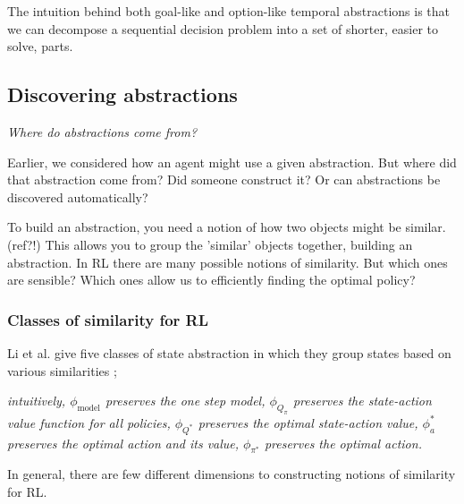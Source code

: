 The intuition behind both goal-like and option-like temporal abstractions is that
we can decompose a sequential decision problem into a set of shorter, easier to solve, parts.

\subsection{Discovering abstractions}

\begin{displayquote}
  \textit{Where do abstractions come from?}
\end{displayquote}

Earlier, we considered how an agent might use a given abstraction.
But where did that abstraction come from? Did someone construct it?
Or can abstractions be discovered automatically?

To build an abstraction, you need a notion of how two objects might be similar. {\color{red}(ref?!)}
This allows you to group the 'similar' objects together, building an abstraction.
In RL there are many possible notions of similarity. But which ones are sensible?
Which ones allow us to efficiently finding the optimal policy?

\vspace{5mm}

\subsubsection{Classes of similarity for RL}

Li et al. give five classes of state abstraction in which they group states based on various similarities \footnotemark[20];

\textit{intuitively,
$\phi_{\text{model}}$ preserves the one step model,
$\phi_{Q_{\pi}}$ preserves the state-action value function for all policies,
$\phi_{Q^{* }}$ preserves the optimal state-action value,
$\phi_a^{* }$ preserves the optimal action and its value,
$\phi_{\pi^{* }}$ preserves the optimal action.}\cite{Littman2006}

In general, there are few different dimensions to constructing notions of similarity for RL.

